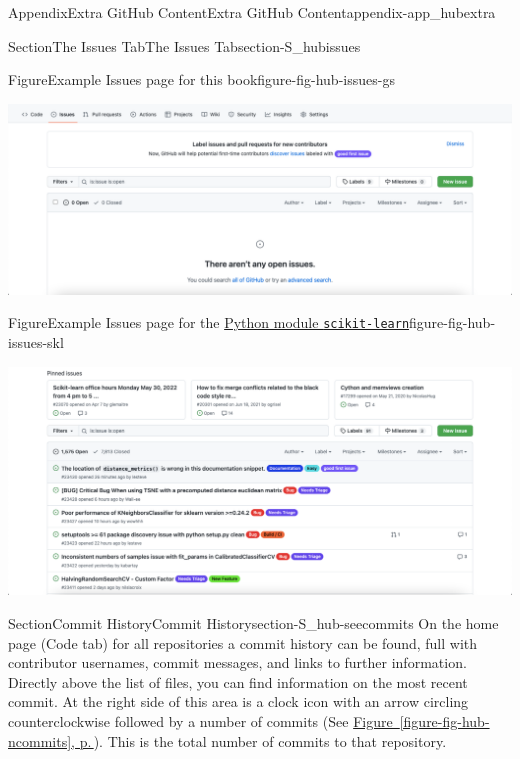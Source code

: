 \documentclass[twoside,10pt,]{book}
\newcommand{\xreffont}{\relax}
\newcommand{\mono}[1]{\texttt{#1}}
\begin{document}
\begin{appendixptx}{Appendix}{Extra GitHub Content}{}{Extra GitHub Content}{}{}{appendix-app_hubextra}
\begin{sectionptx}{Section}{The Issues Tab}{}{The Issues Tab}{}{}{section-S_hubissues}
\begin{figureptx}{Figure}{Example Issues page for this book}{figure-fig-hub-issues-gs}{}%
\begin{image}{0.05}{0.9}{0.05}{}%
\includegraphics[width=\linewidth]{external/hub_issues_gs.pdf}
\end{image}%
\tcblower
\end{figureptx}%
\begin{figureptx}{Figure}{Example Issues page for the \href{https://github.com/scikit-learn/scikit-learn/issues}{Python module \mono{scikit-learn}}\protect\footnotemark{}}{figure-fig-hub-issues-skl}{}%
\begin{image}{0.05}{0.9}{0.05}{}%
\includegraphics[width=\linewidth]{external/hub_issues_skl.pdf}
\end{image}%
\tcblower
\end{figureptx}%
%
\end{sectionptx}
%
%
\typeout{************************************************}
\typeout{************************************************}
%
\begin{sectionptx}{Section}{Commit History}{}{Commit History}{}{}{section-S_hub-seecommits}
%
%
On the home page (Code tab) for all repositories a commit history can be found, full with contributor usernames, commit messages, and links to further information. Directly above the list of files, you can find information on the most recent commit. At the right side of this area is a clock icon with an arrow circling counterclockwise followed by a number of commits (See \hyperref[figure-fig-hub-ncommits]{Figure~{\xreffont\ref{figure-fig-hub-ncommits}}, p.\,\pageref{figure-fig-hub-ncommits}}). This is the total number of commits to that repository.%

\end{sectionptx}
\end{appendixptx}
\end{document}
